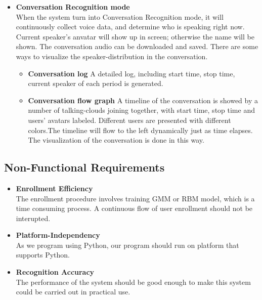 \begin{itemize}
		\item \textbf{Conversation Recognition mode} \\
			When the system turn into Conversation Recognition mode,
			it will continuously collect voice data, and determine
			who is speaking right now. Current speaker's anvatar will show up
			in screen; otherwise the name will be shown. The conversation
			audio can be downloaded and saved.
			There are some ways to visualize the speaker-distribution in the 
			conversation. 
			\begin{itemize}
				\item \textbf{Conversation log}
					A detailed log, including start time, stop time,
					current speaker of each period is generated. 
				\item \textbf{Conversation flow graph}
					A timeline of the conversation is showed by a number of 
					talking-clouds joining together, with start time, stop time
					and users' avatars labeled. Different users are presented 
					with different colors.The timeline will flow to the left dynamically
					just as time elapses. The visualization of the conversation is done
					in this way.
			\end{itemize}

	\end{itemize}

\subsection{Non-Functional Requirements}
	\begin{itemize}
		\item \textbf{Enrollment Efficiency} \\
			The enrollment procedure involves training GMM or RBM model, which
			is a time consuming process. A continuous flow of user enrollment
			should not be interupted.
		\item \textbf{Platform-Independency} \\
			As we program using Python, our program should run on
			platform that supports Python.
		\item \textbf{Recognition Accuracy} \\
			The performance of the system should be good enough to
			make this system could be carried out in practical use.
	\end{itemize}

